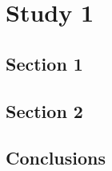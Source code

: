 \chapter{Study 1} \label{chap:study_1}

\section{Section 1}

\section{Section 2}

\section{Conclusions}